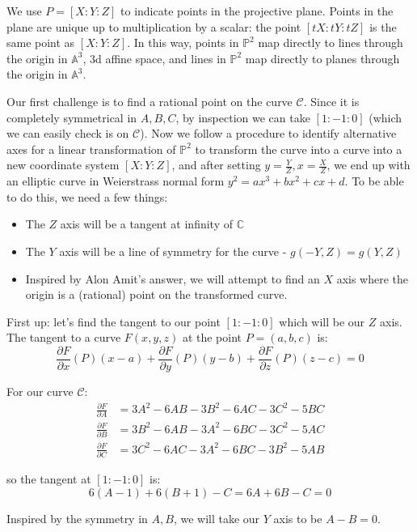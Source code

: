\documentclass{article}
\begin{document}
We use $P = [X:Y:Z]$ to indicate points in the projective plane. Points in the plane are unique up to
multiplication by a scalar: the point $[tX:tY:tZ]$ is the same point as $[X:Y:Z]$. In this way, points in
$\mathbb{P}^2$ map directly to lines through the origin in $\mathbb{A}^3$, 3d affine space, and lines in
$\mathbb{P}^2$ map directly to planes through the origin in $\mathbb{A}^3$.

Our first challenge is to find a rational point on the curve $\mathcal{C}$. Since it is completely symmetrical in
$A, B, C$, by inspection we can take $[1:-1:0]$ (which we can easily check is on $\mathcal{C}$). Now we follow a
procedure to identify alternative axes for a linear transformation of $\mathbb{P}^2$ to transform the curve into a
curve into a new coordinate system $[X:Y:Z]$, and after setting $y = \frac{Y}{Z}, x=\frac{X}{Z}$, we end up with
an elliptic curve in Weierstrass normal form $y^2 = ax^3 + bx^2 + cx + d$. To be able to do this, we need a few things:
\begin{itemize}
	\item The $Z$ axis will be a tangent at infinity of $\mathbb{C}$
	\item The $Y$ axis will be a line of symmetry for the curve - $g(-Y,Z)=g(Y,Z)$
	\item Inspired by Alon Amit's answer, we will attempt to find an $X$ axis where the origin is a
		(rational) point on the transformed curve.
\end{itemize}

First up: let's find the tangent to our point $[1:-1:0]$ which will be our $Z$ axis. The tangent to a curve
$F(x,y,z)$ at the point $P=(a,b,c)$ is:
\[ \frac{\partial{F}}{\partial{x}}(P)(x-a) + \frac{\partial{F}}{\partial{y}}(P)(y-b) + 
\frac{\partial{F}}{\partial{z}}(P)(z-c) = 0 \]

For our curve $\mathcal{C}$:
\begin{equation*}
	\begin{split}
		\frac{\partial{F}}{\partial{A}} &= 3A^2 -6AB -3B^2 -6AC -3C^2 -5BC \\
		\frac{\partial{F}}{\partial{B}} &= 3B^2 -6AB -3A^2 -6BC -3C^2 -5AC \\
		\frac{\partial{F}}{\partial{C}} &= 3C^2 -6AC -3A^2 -6BC -3B^2 -5AB
	\end{split}
\end{equation*}

so the tangent at $[1:-1:0]$ is:
\[ 6(A-1) + 6(B+1) - C = 6A + 6B - C = 0 \]

Inspired by the symmetry in $A,B$, we will take our $Y$ axis to be $A - B = 0$.
\end{document}
